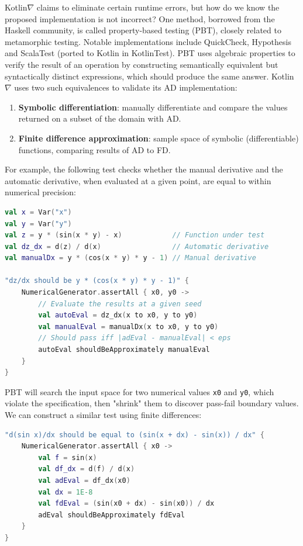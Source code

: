 \documentclass[12pt,initial,twoside,maitrise]{dms}
\numberwithin{equation}{section}
\numberwithin{table}{chapter}
\numberwithin{figure}{chapter}
\begin{document}
Kotlin$\nabla$ claims to eliminate certain runtime errors, but how do we know the proposed implementation is not incorrect? One method, borrowed from the Haskell community, is called property-based testing (PBT), closely related to metamorphic testing. Notable implementations include QuickCheck, Hypothesis and ScalaTest (ported to Kotlin in KotlinTest). PBT uses algebraic properties to verify the result of an operation by constructing semantically equivalent but syntactically distinct expressions, which should produce the same answer. Kotlin$\nabla$ uses two such equivalences to validate its AD implementation:

\begin{enumerate}
    \item \textbf{Symbolic differentiation}: manually differentiate and compare the values returned on a subset of the domain with AD.
    \item \textbf{Finite difference approximation}: sample space of symbolic (differentiable) functions, comparing results of AD to FD.
\end{enumerate}

\noindent For example, the following test checks whether the manual derivative and the automatic derivative, when evaluated at a given point, are equal to within numerical precision:

\begin{lstlisting}[language=Kotlin, showstringspaces=false]
val x = Var("x")
val y = Var("y")
val z = y * (sin(x * y) - x)            // Function under test
val dz_dx = d(z) / d(x)                 // Automatic derivative
val manualDx = y * (cos(x * y) * y - 1) // Manual derivative

"dz/dx should be y * (cos(x * y) * y - 1)" {
    NumericalGenerator.assertAll { x0, y0 ->
        // Evaluate the results at a given seed
        val autoEval = dz_dx(x to x0, y to y0)
        val manualEval = manualDx(x to x0, y to y0)
        // Should pass iff |adEval - manualEval| < eps
        autoEval shouldBeApproximately manualEval
    }
}
\end{lstlisting}

PBT will search the input space for two numerical values \texttt{x0} and \texttt{y0}, which violate the specification, then "shrink" them to discover pass-fail boundary values. We can construct a similar test using finite differences:

\begin{lstlisting}[language=Kotlin, showstringspaces=false]
"d(sin x)/dx should be equal to (sin(x + dx) - sin(x)) / dx" {
    NumericalGenerator.assertAll { x0 ->
        val f = sin(x)
        val df_dx = d(f) / d(x)
        val adEval = df_dx(x0)
        val dx = 1E-8
        val fdEval = (sin(x0 + dx) - sin(x0)) / dx
        adEval shouldBeApproximately fdEval
    }
}
\end{lstlisting}
\end{document}
